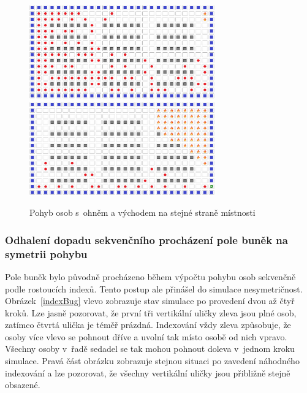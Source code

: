 \documentclass[11pt, titlepage, a4paper]{article}
\begin{document}
        \begin{figure}[H]
            \includegraphics[width=8cm]{TestLayouts/FireExitSameSide/FireExit_SameSide_init}
            \includegraphics[width=8cm]{TestLayouts/FireExitSameSide/FireExit_SameSide_ExitAdded}
            \caption{Pohyb osob s~ohněm a východem na stejné straně místnosti}
            \label{FireExitSameSide}
        \end{figure}


        \subsubsection{Odhalení dopadu sekvenčního procházení pole buněk na symetrii pohybu}
        Pole buněk bylo původně procházeno během výpočtu pohybu osob sekvenčně podle rostoucích indexů. Tento postup ale přinášel do simulace nesymetričnost. Obrázek~\ref{indexBug} vlevo zobrazuje stav simulace po provedení dvou až čtyř kroků. Lze jasně pozorovat, že první tři vertikální uličky zleva jsou plné osob, zatímco čtvrtá ulička je téměř prázdná. Indexování vždy zleva způsobuje, že osoby více vlevo se pohnout dříve a uvolní tak místo osobě od nich vpravo. Všechny osoby v~řadě sedadel se tak mohou pohnout doleva v~jednom kroku simulace. Pravá část obrázku zobrazuje stejnou situaci po zavedení náhodného indexování a lze pozorovat, že všechny vertikální uličky jsou přibližně stejně obsazené.\\
\end{document}
